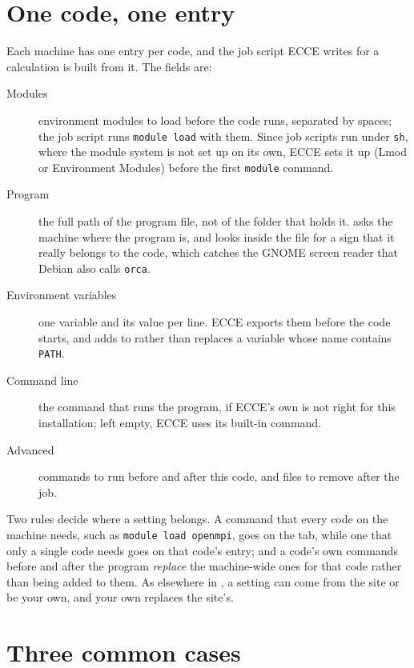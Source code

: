 \section{One code, one entry}
Each machine has one entry per code, and the job script ECCE writes for a calculation is built from it. The fields are:
\begin{description}
	\item[Modules] environment modules to load before the code runs, separated by spaces; the job script runs \texttt{module load} with them. Since job scripts run under \texttt{sh}, where the module system is not set up on its own, ECCE sets it up (Lmod or Environment Modules) before the first \texttt{module} command.
	\item[Program] the full path of the program file, not of the folder that holds it.  asks the machine where the program is, and  looks inside the file for a sign that it really belongs to the code, which catches the GNOME screen reader that Debian also calls \texttt{orca}.
	\item[Environment variables] one variable and its value per line. ECCE exports them before the code starts, and adds to rather than replaces a variable whose name contains \texttt{PATH}.
	\item[Command line] the command that runs the program, if ECCE's own is not right for this installation; left empty, ECCE uses its built-in command.
	\item[Advanced] commands to run before and after this code, and files to remove after the job.
\end{description}

Two rules decide where a setting belongs. A command that every code on the machine needs, such as \texttt{module load openmpi}, goes on the  tab, while one that only a single code needs goes on that code's entry; and a code's own commands before and after the program \emph{replace} the machine-wide ones for that code rather than being added to them. As elsewhere in , a setting can come from the site or be your own, and your own replaces the site's.

\section{Three common cases}
